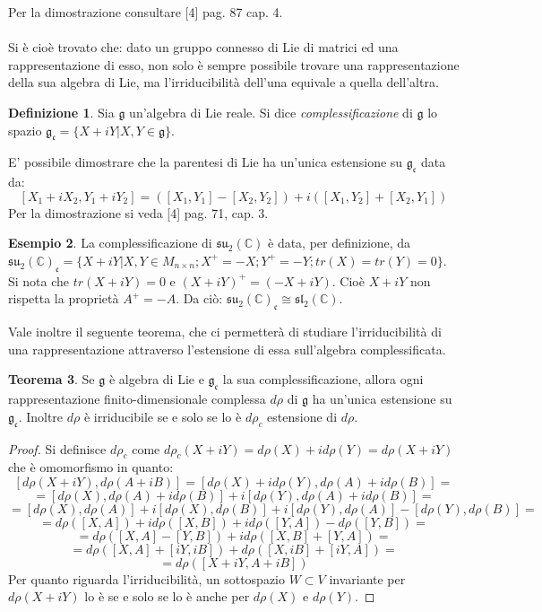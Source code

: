 \documentclass[12pt,a4paper]{report}
\theoremstyle{definition}
\newtheorem{Def}{Definizione}[chapter]
\theoremstyle{Theorem}
\newtheorem{Theo}[Def]{Teorema}
\theoremstyle{definition}
\newtheorem{Ex}[Def]{Esempio}
\theoremstyle{definition}
\theoremstyle{definition}
\begin{document}
Per la dimostrazione consultare [4] pag. 87 cap. 4.\\
\\
Si è cioè trovato che: dato un gruppo connesso di Lie di matrici ed una rappresentazione di esso, non solo è sempre possibile trovare una rappresentazione della sua algebra di Lie, ma l'irriducibilità dell'una equivale a quella dell'altra.
\begin{Def}
	Sia $\mathfrak{g}$ un'algebra di Lie reale. Si dice \textit{complessificazione} di $\mathfrak{g}$ lo spazio $\mathfrak{g_c}=\{X+iY|X,Y\in\mathfrak{g}\}$.
\end{Def}
E' possibile dimostrare che la parentesi di Lie ha un'unica estensione su $\mathfrak{g_c}$ data da:
$$[X_1+iX_2,Y_1+iY_2]=([X_1,Y_1]-[X_2,Y_2])+i([X_1,Y_2]+[X_2,Y_1])$$
Per la dimostrazione si veda [4] pag. 71, cap. 3.\\
\begin{Ex}
La complessificazione di $\mathfrak{su_2(\mathbb{C})}$ è data, per definizione, da \\$\mathfrak{su_2(\mathbb{C})_c}=\{X+iY|X,Y\in M_{n\times n} ;X^{+}=-X;Y^{+}=-Y;tr(X)=tr(Y)=0\}$.\\
Si nota che $tr(X+iY)=0$ e $(X+iY)^+=(-X+iY)$. Cioè $X+iY$ non rispetta la proprietà $A^+=-A$. Da ciò: $\mathfrak{su_2(\mathbb{C})_c}\cong \mathfrak{sl_2(\mathbb{C})}$.
\end{Ex}
Vale inoltre il seguente teorema, che ci permetterà di studiare l'irriducibilità di una rappresentazione attraverso l'estensione di essa sull'algebra complessificata.
\begin{Theo}
	Se $\mathfrak{g}$ è algebra di Lie e $\mathfrak{g_c}$ la sua complessificazione, allora ogni rappresentazione finito-dimensionale complessa  $d\rho$ di $\mathfrak{g}$ ha un'unica estensione su $\mathfrak{g_c}$. Inoltre $d\rho$ è irriducibile se e solo se lo è $d\rho_c$ estensione di $d\rho$.
\end{Theo}
\begin{proof}
	Si definisce $d\rho_c$ come $d\rho_c(X+iY)=d\rho(X)+id\rho(Y)=d\rho(X+iY)$ che è omomorfismo in quanto: 
	$$[d\rho(X+iY),d\rho(A+iB)]=[d\rho(X)+id\rho(Y),d\rho(A)+id\rho(B)]=$$$$=[d\rho(X),d\rho(A)+id\rho(B)]+i[d\rho(Y),d\rho(A)+id\rho(B)]=$$
	$$=[d\rho(X),d\rho(A)]+i[d\rho(X),d\rho(B)]+i[d\rho(Y),d\rho(A)]-[d\rho(Y),d\rho(B)]=$$
	$$=d\rho([X,A])+id\rho([X,B])+id\rho([Y,A])-d\rho([Y,B])=$$
	$$=d\rho([X,A]-[Y,B])+id\rho([X,B]+[Y,A])=$$
	$$=d\rho([X,A]+[iY,iB])+d\rho([X,iB]+[iY,A])=$$
	$$=d\rho([X+iY,A+iB])$$
	Per quanto riguarda l'irriducibilità, un sottospazio $W\subset V$ invariante per $d\rho(X+iY)$ lo è se e solo se lo è anche per $d\rho(X)$ e $d\rho(Y)$.
\end{proof}
\end{document}
